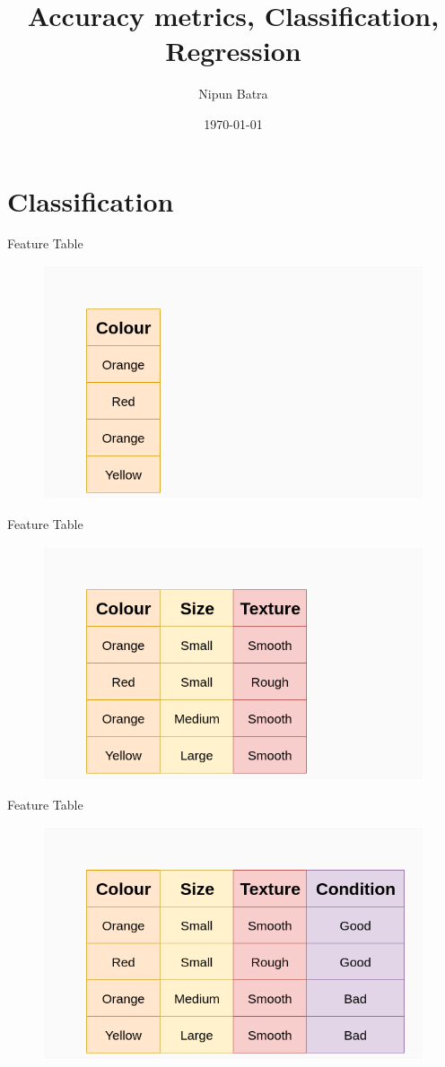\documentclass{beamer}
\title{Accuracy metrics, Classification, Regression}
\date{\today}
\author{Nipun Batra}
\institute{IIT Gandhinagar}
\begin{document}
  \maketitle
  
  
  
\section{Classification}

\begin{frame}{Feature Table}
\begin{figure}[htp]
    \centering
    \includegraphics[width=0.7\linewidth]{accuracy/ml_2_accuracy_table_1.png}
\end{figure}
\end{frame}

\begin{frame}{Feature Table}
\begin{figure}[htp]
    \centering
    \includegraphics[width=0.7\linewidth]{accuracy/ml_2_accuracy_table_2.png}
\end{figure}
\end{frame}

\begin{frame}{Feature Table}
\begin{figure}[htp]
    \centering
    \includegraphics[width=0.7\linewidth]{accuracy/ml_2_accuracy_table_3.png}
\end{figure}
\end{frame}
\end{document}
